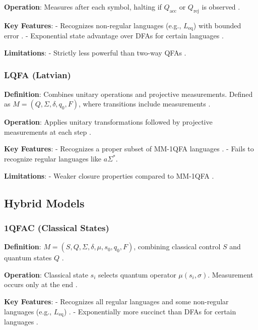 \textbf{Operation}: Measures after each symbol, halting if \( Q_{\text{acc}} \) or \( Q_{\text{rej}} \) is observed \cite{kondacs1997power}.

\textbf{Key Features}:
- Recognizes non-regular languages (e.g., \( L_{\text{eq}} \)) with bounded error \cite{kondacs1997power}.
- Exponential state advantage over DFAs for certain languages \cite{ambainis2009superiority}.

\textbf{Limitations}: 
- Strictly less powerful than two-way QFAs \cite{ambainis2009superiority}.

\subsubsection{LQFA (Latvian)}
\label{sssec:lqfa}

\textbf{Definition}: Combines unitary operations and projective measurements. Defined as \( M = (Q, \Sigma, \delta, q_0, F) \), where transitions include measurements \cite{ambainis2002quantum}.

\textbf{Operation}: Applies unitary transformations followed by projective measurements at each step \cite{ambainis2002quantum}.

\textbf{Key Features}:
- Recognizes a proper subset of MM-1QFA languages \cite{ambainis2002quantum}.
- Fails to recognize regular languages like \( a\Sigma^* \).

\textbf{Limitations}: 
- Weaker closure properties compared to MM-1QFA \cite{ambainis2002quantum}.

\subsection{Hybrid Models}
\label{subsec:hybrid-models}

\subsubsection{1QFAC (Classical States)}
\label{sssec:1qfac}

\textbf{Definition}: \( M = (S, Q, \Sigma, \delta, \mu, s_0, q_0, F) \), combining classical control \( S \) and quantum states \( Q \) \cite{zheng2012one}.

\textbf{Operation}: Classical state \( s_i \) selects quantum operator \( \mu(s_i, \sigma) \). Measurement occurs only at the end \cite{zheng2012one}.

\textbf{Key Features}:
- Recognizes all regular languages and some non-regular languages (e.g., \( L_{\text{eq}} \)) \cite{zheng2012one}.
- Exponentially more succinct than DFAs for certain languages \cite{bianchi2014size}.

